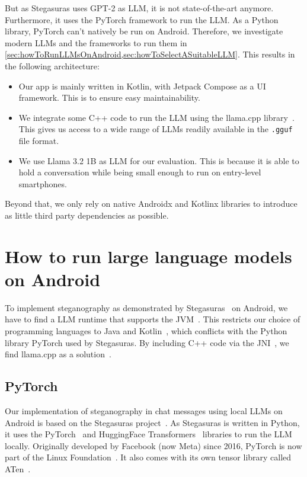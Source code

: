But as Stegasuras uses GPT-2 as \gls{LLM}, it is not state-of-the-art anymore. Furthermore, it uses the PyTorch framework to run the \gls{LLM}. As a Python library, PyTorch can't natively be run on Android. Therefore, we investigate modern \glspl{LLM} and the frameworks to run them in \cref{sec:howToRunLLMsOnAndroid,sec:howToSelectASuitableLLM}. This results in the following architecture:
\begin{itemize}
	\item Our app is mainly written in Kotlin, with Jetpack Compose as a \gls{UI} framework. This is to ensure easy maintainability.
	\item We integrate some C++ code to run the \gls{LLM} using the llama.cpp library~\cite{gerganovGgerganovLlamacpp2024}. This gives us access to a wide range of \glspl{LLM} readily available in the \lstinline|.gguf| file format.
	\item We use Llama 3.2 1B as \gls{LLM} for our evaluation. This is because it is able to hold a conversation while being small enough to run on entry-level smartphones.
\end{itemize}

Beyond that, we only rely on native Androidx and Kotlinx libraries to introduce as little third party dependencies as possible.

\section{How to run large language models on Android}
\label{sec:howToRunLLMsOnAndroid}
To implement steganography as demonstrated by Stegasuras~\cite{zieglerNeuralLinguisticSteganography2019} on Android, we have to find a \gls{LLM} runtime that supports the \gls{JVM}~\cite{ruggiaDarkSideNative2025}. This restricts our choice of programming languages to Java and Kotlin~\cite{ruggiaDarkSideNative2025}, which conflicts with the Python library PyTorch used by Stegasuras. By including C++ code via the \gls{JNI}~\cite{ruggiaDarkSideNative2025}, we find llama.cpp as a solution~\cite{gerganovGgerganovLlamacpp2024}.

\subsection{PyTorch}
\label{sec:pyTorch}
Our implementation of steganography in chat messages using local \glspl{LLM} on Android is based on the Stegasuras project~\cite{zieglerNeuralLinguisticSteganography2019}. As Stegasuras is written in Python, it uses the PyTorch~\cite{anselPyTorch2Faster2024} and HuggingFace Transformers~\cite{wolfTransformersStateoftheArtNatural2020} libraries to run the \gls{LLM} locally. Originally developed by Facebook (now Meta) since 2016, PyTorch is now part of the Linux Foundation~\cite{chintalaPyTorchStrengthensIts2022}. It also comes with its own tensor library called ATen~\cite{devitoZdevitoATen2025}.

